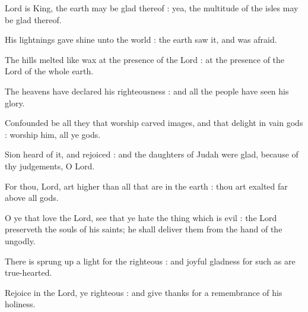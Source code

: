  Lord is King, the earth may be glad thereof : yea, the multitude of the isles may be glad thereof.\par
{}
His lightnings gave shine unto the world : the earth saw it, and was afraid.\par
{}The hills melted like wax at the presence of the Lord : at the presence of the Lord of the whole earth.\par
{}The heavens have declared his righteousness : and all the people have seen his glory.\par
{}Confounded be all they that worship carved images, and that delight in vain gods : worship him, all ye gods.\par
{}Sion heard of it, and rejoiced : and the daughters of Judah were glad, because of thy judgements, O Lord.\par
{}For thou, Lord, art higher than all that are in the earth : thou art exalted far above all gods.\par
{}O ye that love the Lord, see that ye hate the thing which is evil : the Lord preserveth the souls of his saints; he shall deliver them from the hand of the ungodly.\par
{}There is sprung up a light for the righteous : and joyful gladness for such as are true-hearted.\par
{}Rejoice in the Lord, ye righteous : and give thanks for a remembrance of his holiness.\par



